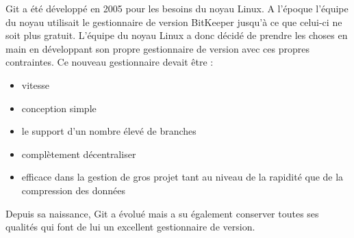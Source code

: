 \documentclass[a4paper]{article}
\begin{document}
Git a été développé en 2005 pour les besoins du noyau Linux. A l'époque l'équipe du noyau utilisait le gestionnaire de version BitKeeper jusqu'à ce que celui-ci ne soit plus gratuit. L'équipe du noyau Linux a donc décidé de prendre les choses en main en développant son propre gestionnaire de version avec ces propres contraintes. Ce nouveau gestionnaire devait être :
\begin{itemize}

\item vitesse
\item conception simple
\item le support d'un nombre élevé de branches
\item complètement décentraliser
\item efficace dans la gestion de gros projet tant au niveau de la rapidité que de la compression des données

\end{itemize}

Depuis sa naissance, Git a évolué mais a su également conserver toutes ses qualités qui font de lui un excellent gestionnaire de version.
\end{document}

